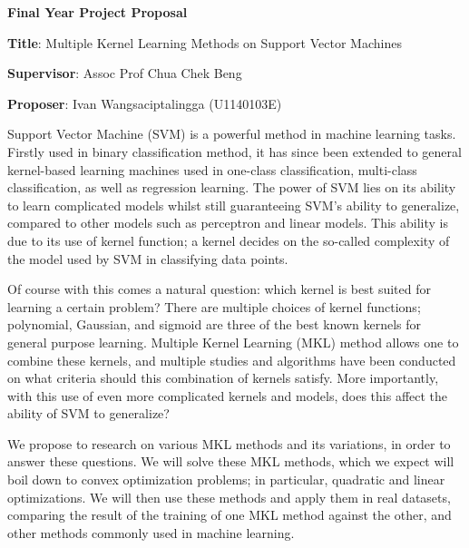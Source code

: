 \documentclass[11pt]{article}%
\begin{document}
\sffamily

\begin{center}
\LARGE \textbf{Final Year Project Proposal}
\end{center}

\bigskip


\noindent \large \textbf{Title}: Multiple Kernel Learning Methods on Support Vector Machines

\noindent \textbf{Supervisor}: Assoc Prof Chua Chek Beng

\noindent \textbf{Proposer}: Ivan Wangsaciptalingga (U1140103E)

\bigskip

\bigskip

\normalsize

Support Vector Machine (SVM) is a powerful method in machine learning tasks. Firstly used in binary classification method, it has since been extended to general kernel-based learning machines used in one-class classification, multi-class classification, as well as regression learning. The power of SVM lies on its ability to learn complicated models whilst still guaranteeing SVM's ability to generalize, compared to other models such as perceptron and linear models. This ability is due to its use of kernel function; a kernel decides on the so-called complexity of the model used by SVM in classifying data points.

Of course with this comes a natural question: which kernel is best suited for learning a certain problem? There are multiple choices of kernel functions; polynomial, Gaussian, and sigmoid are three of the best known kernels for general purpose learning. Multiple Kernel Learning (MKL) method allows one to combine these kernels, and multiple studies and algorithms have been conducted on what criteria should this combination of kernels satisfy. More importantly, with this use of even more complicated kernels and models, does this affect the ability of SVM to generalize?

We propose to research on various MKL methods and its variations, in order to answer these questions. We will solve these MKL methods, which we expect will boil down to convex optimization problems; in particular, quadratic and linear optimizations. We will then use these methods and apply them in real datasets, comparing the result of the training of one MKL method against the other, and other methods commonly used in machine learning.
\end{document}
